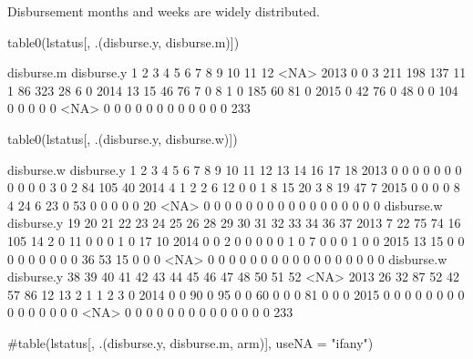 Disbursement months and weeks are widely distributed.
\begin{Schunk}
\begin{Sinput}
table0(lstatus[, .(disburse.y, disburse.m)])
\end{Sinput}
\begin{Soutput}
          disburse.m
disburse.y   1   2   3   4   5   6   7   8   9  10  11  12 <NA>
      2013   0   0   3 211 198 137  11   1  86 323  28   6    0
      2014  13  15  46  76   7   0   8   1   0 185  60  81    0
      2015   0  42  76   0  48   0   0 104   0   0   0   0    0
      <NA>   0   0   0   0   0   0   0   0   0   0   0   0  233
\end{Soutput}
\begin{Sinput}
table0(lstatus[, .(disburse.y, disburse.w)])
\end{Sinput}
\begin{Soutput}
          disburse.w
disburse.y   1   2   3   4   5   6   7   8   9  10  11  12  13  14  16  17  18
      2013   0   0   0   0   0   0   0   0   0   0   0   3   0   2  84 105  40
      2014   4   1   2   2   6  12   0   0   1   8  15  20   3   8  19  47   7
      2015   0   0   0   0   8   4  24   6  23   0  53   0   0   0   0   0  20
      <NA>   0   0   0   0   0   0   0   0   0   0   0   0   0   0   0   0   0
          disburse.w
disburse.y  19  20  21  22  23  24  25  26  28  29  30  31  32  33  34  36  37
      2013   7  22  75  74  16 105  14   2   0  11   0   0   0   1   0  17  10
      2014   0   0   2   0   0   0   0   0   1   0   7   0   0   0   1   0   0
      2015  13  15   0   0   0   0   0   0   0   0   0  36  53  15   0   0   0
      <NA>   0   0   0   0   0   0   0   0   0   0   0   0   0   0   0   0   0
          disburse.w
disburse.y  38  39  40  41  42  43  44  45  46  47  48  50  51  52 <NA>
      2013  26  32  87  52  42  57  86  12  13   2   1   1   2   3    0
      2014   0   0  90   0  95   0   0  60   0   0   0  81   0   0    0
      2015   0   0   0   0   0   0   0   0   0   0   0   0   0   0    0
      <NA>   0   0   0   0   0   0   0   0   0   0   0   0   0   0  233
\end{Soutput}
\begin{Sinput}
#table(lstatus[, .(disburse.y, disburse.m, arm)], useNA = "ifany")
\end{Sinput}
\end{Schunk}


